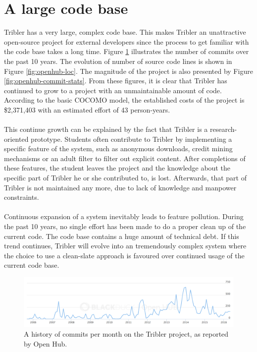 \section{A large code base}
Tribler has a very large, complex code base. This makes Tribler an unattractive open-source project for external developers since the process to get familiar with the code base takes a long time. Figure \ref{fig:openhub-commits} illustrates the number of commits over the past 10 years. The evolution of number of source code lines is shown in Figure \ref{fig:openhub-loc}. The magnitude of the project is also presented by Figure \ref{fig:openhub-commit-stats}. From these figures, it is clear that Tribler has continued to grow to a project with an unmaintainable amount of code. According to the basic COCOMO\cite{kemerer1987empirical} model, the established costs of the project is \$2,371,403 with an estimated effort of 43 person-years.\\\\
This continue growth can be explained by the fact that Tribler is a research-oriented prototype. Students often contribute to Tribler by implementing a specific feature of the system, such as anonymous downloads, credit mining mechanisms or an adult filter to filter out explicit content. After completions of these features, the student leaves the project and the knowledge about the specific part of Tribler he or she contributed to, is lost. Afterwards, that part of Tribler is not maintained any more, due to lack of knowledge and manpower constraints.\\\\
Continuous expansion of a system inevitably leads to feature pollution. During the past 10 years, no single effort has been made to do a proper clean up of the current code. The code base contains a huge amount of technical debt. If this trend continues, Tribler will evolve into an tremendously complex system where the choice to use a clean-slate approach is favoured over continued usage of the current code base.

\begin{figure}[!h]
	\centering
	\includegraphics[width=\columnwidth]{images/problem_description/openhub_commits}
	\caption{A history of commits per month on the Tribler project, as reported by Open Hub.}
	\label{fig:openhub-commits}
\end{figure}

